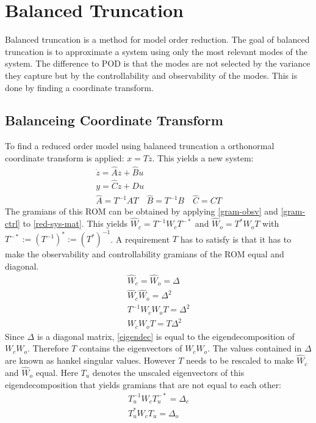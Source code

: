 \section{Balanced Truncation} \label{bt}
Balanced truncation is a method for model order reduction.
The goal of balanced truncation is to approximate a system using only the most relevant modes of the system.
The difference to POD is that the modes are not selected by the variance they capture but by the controllability and observability of the modes.
This is done by finding a coordinate transform.
\subsection{Balanceing Coordinate Transform} \label{balre}
To find a reduced order model using balanced truncation a orthonormal coordinate transform is applied: \(x = Tz\).
This yields a new system:
\begin{gather}
\dot{z} = \hat{A}z + \hat{B}u \label{z1}\\
y = \hat{C}z + Du \label{z2} \\
\hat{A} = T^{-1}AT \quad \hat{B} = T^{-1}B \quad \hat{C} = CT \label{red-sys-mat}
\end{gather}
The gramians of this ROM can be obtained by applying  \ref{gram-obsv} and \ref{gram-ctrl} to \ref{red-sys-mat}.
This yields \(\hat{W}_c = T^{-1}W_cT^{-*}\) and \(\hat{W}_o = T^{*}W_oT\) with  \(T^{-*} := (T^{-1})^{*} := (T^{*})^{-1}\).
A requirement \(T\) has to satisfy is that it has to make the observability and controllability gramians of the ROM equal and diagonal.
\begin{gather}
\hat{W}_c = \hat{W}_o = \Delta \\
\hat{W}_c \hat{W}_o = \Delta^{2} \\
T^{-1}W_cW_oT = \Delta^{2} \\
W_cW_oT = T\Delta^{2} \label{eigendec}
\end{gather}
Since \(\Delta\) is a diagonal matrix, \ref{eigendec} is equal to the eigendecomposition of \(W_cW_o\).
Therefore \(T\) contains the eigenvectors of \(W_cW_o\).
The values contained in \(\Delta\) are known as hankel singular values.
However \(T\) needs to be rescaled to make \(\hat{W}_c\) and \(\hat{W}_o\) equal.
Here \(T_u\) denotes the unscaled eigenvectors of this eigendecomposition that yields gramians that are not equal to each other:
\begin{gather}
T_u^{-1}W_cT_u^{-*} = \Delta_c \label{1}\\
T_u^{*}W_cT_u = \Delta_o \label{2}
\end{gather}
